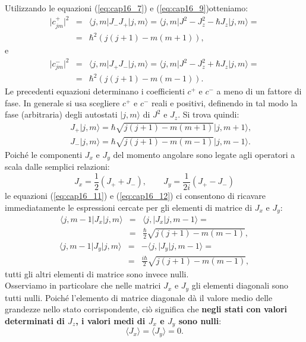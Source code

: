 \documentclass[a4paper,12pt,oneside]{book}
\begin{document}
Utilizzando le equazioni (\ref{eq:cap16_7}) e (\ref{eq:cap16_9})otteniamo:
\begin{eqnarray}
\vert c_{jm} ^+\vert ^2 &=& \langle j, m \vert J_- J_+\vert j, m \rangle = \langle j, m \vert J^2- J_z ^2 -\hbar J_z\vert j, m \rangle =\nonumber \\
&=& \hbar ^2 \left( j(j+1) - m (m+1)\right) ,
\end{eqnarray}
e
\begin{eqnarray}
\vert c_{jm} ^-\vert ^2 &=& \langle j, m \vert J_+ J_-\vert j, m \rangle = \langle j, m \vert J^2- J_z ^2 +\hbar J_z\vert j, m \rangle =\nonumber \\
&=& \hbar ^2 \left( j(j+1) - m (m-1)\right) .
\end{eqnarray}
Le precedenti equazioni determinano i coefficienti $c^+$ e $c^-$ a meno di un fattore di fase. In generale si usa scegliere $c^+$ e $c^-$ reali e positivi, definendo in tal modo la fase (arbitraria) degli autostati $\vert j,m \rangle$ di $J^2$ e $J_z$. Si trova quindi:
\begin{eqnarray}
& &J_+\vert j, m \rangle =\hbar \sqrt{j(j+1)-m(m+1)}\vert j, m+1 \rangle ,  \label{eq:cap16_11} \\
& &J_-\vert j, m \rangle =\hbar \sqrt{j(j+1)-m(m-1)}\vert j, m-1 \rangle  .\label{eq:cap16_12}
\end{eqnarray}
Poiché le componenti $J_x$ e $J_y$ del momento angolare sono legate agli operatori a scala dalle semplici relazioni:
\begin{equation}
J_x= \frac{1}{2}\left(J_+ + J_-\right),\qquad J_y= \frac{1}{2i}\left(J_+ - J_-\right)
\end{equation}
le equazioni (\ref{eq:cap16_11}) e (\ref{eq:cap16_12}) ci consentono di ricavare immediatamente le espressioni cercate per gli elementi di matrice di $J_x$ e $J_y$:
\begin{eqnarray}
\langle j, m-1\vert J_x\vert j, m \rangle &=&\langle j, \vert J_x\vert j, m-1 \rangle = \nonumber \\
&=& \frac{\hbar}{2}\sqrt{j(j+1)-m(m-1)} , 
\end{eqnarray}
\begin{eqnarray}
\langle j, m-1\vert J_y\vert j, m \rangle &=& -\langle j, \vert J_y\vert j, m-1 \rangle = \nonumber \\
&=& \frac{i\hbar}{2}\sqrt{j(j+1)-m(m-1)} , 
\end{eqnarray}
tutti gli altri elementi di matrice sono invece nulli.\\
Osserviamo in particolare che nelle matrici $J_x$ e $J_y$ gli elementi diagonali sono tutti nulli. Poiché l'elemento di matrice diagonale dà il valore medio delle grandezze nello stato corrispondente, ciò significa che \textbf{negli stati con valori determinati di $J_z$, i valori medi di $J_x$ e $J_y$ sono nulli}:
\begin{equation}
\langle J_x \rangle = \langle J_y \rangle =0.
\end{equation}
\end{document}
